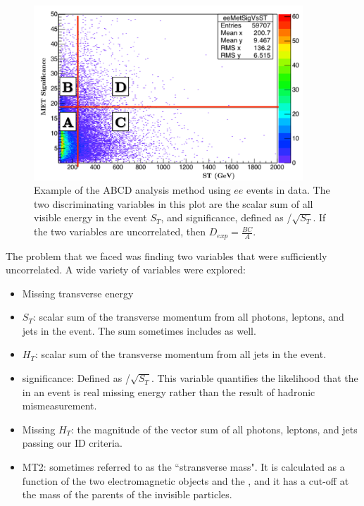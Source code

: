 \begin{figure}[h]
\begin{center}
\includegraphics[width=0.9\textwidth]{Figures/Appendix/ABCD_demo.pdf}
\end{center}
\caption[Example of the ABCD analysis method using $ee$ events in data.]
{Example of the ABCD analysis method using $ee$ events in data. The two discriminating variables in this plot
are the scalar sum of all visible energy in the event $S_T$, and \ETmiss significance, defined as \ETmiss/$\sqrt{S_T}$. If the two 
variables are uncorrelated, then $D_{exp}= \frac{BC}{A}$.}
\label{fig:ABCD}
\end{figure}

The problem that we faced was finding two variables that were sufficiently uncorrelated. 
A wide variety of variables were explored:
\begin{itemize}[leftmargin=*]
\item Missing transverse energy \ETmiss
\item $S_T$: scalar sum of the transverse momentum from all photons, leptons, and jets in the event. The sum sometimes includes \ETmiss as well.
\item $H_T$: scalar sum of the transverse momentum from all jets in the event. 
\item \ETmiss significance: Defined as \ETmiss/$\sqrt{S_T}$. This variable quantifies the likelihood that the \ETmiss in an event is real missing energy rather than the result of hadronic mismeasurement. 
\item Missing $H_T$: the magnitude of the vector sum of all photons, leptons, and jets passing our ID criteria.
\item MT2: sometimes referred to as the ``stransverse mass". It is calculated as a function of the two electromagnetic objects and the \ETmiss, and it has a cut-off at the mass of the parents of the invisible particles.
\end{itemize}

